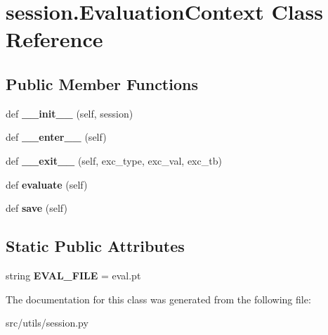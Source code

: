 \hypertarget{classsession_1_1EvaluationContext}{}\section{session.\+Evaluation\+Context Class Reference}
\label{classsession_1_1EvaluationContext}
\subsection*{Public Member Functions}
\begin{DoxyCompactItemize}
\item 
def {\bfseries \+\_\+\+\_\+init\+\_\+\+\_\+} (self, session)\hypertarget{classsession_1_1EvaluationContext_af632e4b9548697bb4746dd311acf1ba8}{}\label{classsession_1_1EvaluationContext_af632e4b9548697bb4746dd311acf1ba8}

\item 
def {\bfseries \+\_\+\+\_\+enter\+\_\+\+\_\+} (self)\hypertarget{classsession_1_1EvaluationContext_a86f2b7ec1b6da4daf1de2c7a6ea7cf74}{}\label{classsession_1_1EvaluationContext_a86f2b7ec1b6da4daf1de2c7a6ea7cf74}

\item 
def {\bfseries \+\_\+\+\_\+exit\+\_\+\+\_\+} (self, exc\+\_\+type, exc\+\_\+val, exc\+\_\+tb)\hypertarget{classsession_1_1EvaluationContext_a0595f94dad0457edaff2b91625ee097d}{}\label{classsession_1_1EvaluationContext_a0595f94dad0457edaff2b91625ee097d}

\item 
def {\bfseries evaluate} (self)\hypertarget{classsession_1_1EvaluationContext_a73262545d159ef7d94d72d205274630e}{}\label{classsession_1_1EvaluationContext_a73262545d159ef7d94d72d205274630e}

\item 
def {\bfseries save} (self)\hypertarget{classsession_1_1EvaluationContext_a5f63c9bf32f8581ac474543a864c1742}{}\label{classsession_1_1EvaluationContext_a5f63c9bf32f8581ac474543a864c1742}

\end{DoxyCompactItemize}
\subsection*{Static Public Attributes}
\begin{DoxyCompactItemize}
\item 
string {\bfseries E\+V\+A\+L\+\_\+\+F\+I\+LE} = \textquotesingle{}eval.\+pt\textquotesingle{}\hypertarget{classsession_1_1EvaluationContext_a0a54ef1a53ca4a5fc7074b3eb16910be}{}\label{classsession_1_1EvaluationContext_a0a54ef1a53ca4a5fc7074b3eb16910be}

\end{DoxyCompactItemize}


The documentation for this class was generated from the following file\+:\begin{DoxyCompactItemize}
\item 
src/utils/session.\+py\end{DoxyCompactItemize}
